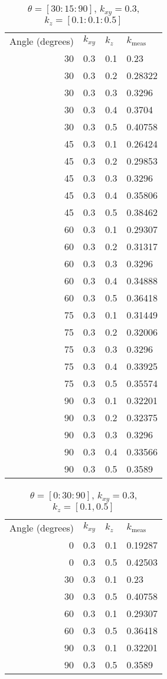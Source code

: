 \begin{table}[H]
\caption{\(\theta=[30:15:90]\), \(k_{xy} = 0.3\), \(k_z = [0.1:0.1:0.5]\)}
\begin{tabular}{r l l | l}
Angle (degrees) & \(k_{xy}\) & \(k_z\) & \(k_{\textrm{meas}}\)\\
30 & 0.3 & 0.1 & 0.23\\
30 & 0.3 & 0.2 & 0.28322\\
30 & 0.3 & 0.3 & 0.3296\\
30 & 0.3 & 0.4 & 0.3704\\
30 & 0.3 & 0.5 & 0.40758\\
45 & 0.3 & 0.1 & 0.26424\\
45 & 0.3 & 0.2 & 0.29853\\
45 & 0.3 & 0.3 & 0.3296\\
45 & 0.3 & 0.4 & 0.35806\\
45 & 0.3 & 0.5 & 0.38462\\
60 & 0.3 & 0.1 & 0.29307\\
60 & 0.3 & 0.2 & 0.31317\\
60 & 0.3 & 0.3 & 0.3296\\
60 & 0.3 & 0.4 & 0.34888\\
60 & 0.3 & 0.5 & 0.36418\\
75 & 0.3 & 0.1 & 0.31449\\
75 & 0.3 & 0.2 & 0.32006\\
75 & 0.3 & 0.3 & 0.3296\\
75 & 0.3 & 0.4 & 0.33925\\
75 & 0.3 & 0.5 & 0.35574\\
90 & 0.3 & 0.1 & 0.32201\\
90 & 0.3 & 0.2 & 0.32375\\
90 & 0.3 & 0.3 & 0.3296\\
90 & 0.3 & 0.4 & 0.33566\\
90 & 0.3 & 0.5 & 0.3589\\
\end{tabular}
\end{table}

\begin{table}[H]
\caption{\(\theta=[0:30:90]\), \(k_{xy} = 0.3\), \(k_z = [0.1, 0.5]\)}
\begin{tabular}{r l l | l}
Angle (degrees) & \(k_{xy}\) & \(k_z\) & \(k_{\textrm{meas}}\)\\
0 & 0.3 & 0.1 & 0.19287\\
0 & 0.3 & 0.5 & 0.42503\\
30 & 0.3 & 0.1 & 0.23\\
30 & 0.3 & 0.5 & 0.40758\\
60 & 0.3 & 0.1 & 0.29307\\
60 & 0.3 & 0.5 & 0.36418\\
90 & 0.3 & 0.1 & 0.32201\\
90 & 0.3 & 0.5 & 0.3589\\
\end{tabular}
\end{table}

